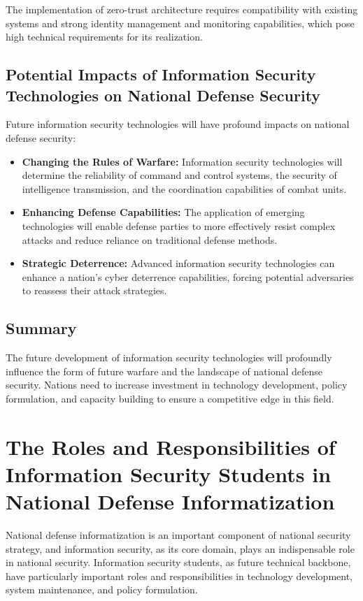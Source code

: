 \documentclass[12pt, a4paper]{article}
\begin{document}
The implementation of zero-trust architecture requires compatibility with existing systems and strong identity management and monitoring capabilities, which pose high technical requirements for its realization.

\subsection{Potential Impacts of Information Security Technologies on National Defense Security}
Future information security technologies will have profound impacts on national defense security:

\begin{itemize}
    \item \textbf{Changing the Rules of Warfare:} Information security technologies will determine the reliability of command and control systems, the security of intelligence transmission, and the coordination capabilities of combat units.
    \item \textbf{Enhancing Defense Capabilities:} The application of emerging technologies will enable defense parties to more effectively resist complex attacks and reduce reliance on traditional defense methods.
    \item \textbf{Strategic Deterrence:} Advanced information security technologies can enhance a nation's cyber deterrence capabilities, forcing potential adversaries to reassess their attack strategies.
\end{itemize}

\subsection{Summary}
The future development of information security technologies will profoundly influence the form of future warfare and the landscape of national defense security. Nations need to increase investment in technology development, policy formulation, and capacity building to ensure a competitive edge in this field.

\section{The Roles and Responsibilities of Information Security Students in National Defense Informatization}

National defense informatization is an important component of national security strategy, and information security, as its core domain, plays an indispensable role in national security. Information security students, as future technical backbone, have particularly important roles and responsibilities in technology development, system maintenance, and policy formulation.
\end{document}
